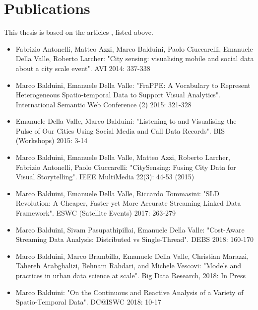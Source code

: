 \section{Publications}

This thesis is based on the articles \cite{DBLP:conf/avi/AntonelliABCVL14,DBLP:conf/semweb/BalduiniV15,DBLP:conf/bis/ValleB15,DBLP:conf/esws/BalduiniV017a,DBLP:journals/ieeemm/BalduiniVALAC15,DBLP:conf/debs/BalduiniPV18,BalduiniJBD2018,BalduiniISWC2018DC}, listed above.

\begin{itemize}
\item Fabrizio Antonelli, Matteo Azzi, Marco Balduini, Paolo Ciuccarelli, Emanuele Della Valle, Roberto Larcher:
"City sensing: visualising mobile and social data about a city scale event". AVI 2014: 337-338

\item Marco Balduini, Emanuele Della Valle:
"FraPPE: A Vocabulary to Represent Heterogeneous Spatio-temporal Data to Support Visual Analytics". International Semantic Web Conference (2) 2015: 321-328

\item 	Emanuele Della Valle, Marco Balduini:
"Listening to and Visualising the Pulse of Our Cities Using Social Media and Call Data Records". BIS (Workshops) 2015: 3-14

\item Marco Balduini, Emanuele Della Valle, Matteo Azzi, Roberto Larcher, Fabrizio Antonelli, Paolo Ciuccarelli:
"CitySensing: Fusing City Data for Visual Storytelling". IEEE MultiMedia 22(3): 44-53 (2015)

\item 	Marco Balduini, Emanuele Della Valle, Riccardo Tommasini:
"SLD Revolution: A Cheaper, Faster yet More Accurate Streaming Linked Data Framework". ESWC (Satellite Events) 2017: 263-279

\item Marco Balduini, Sivam Pasupathipillai, Emanuele Della Valle:
"Cost-Aware Streaming Data Analysis: Distributed vs Single-Thread". DEBS 2018: 160-170

\item Marco Balduini, Marco Brambilla, Emanuele Della Valle, Christian Marazzi, Tahereh Arabghalizi, Behnam Rahdari, and Michele Vescovi:
"Models and practices in urban data science at scale". Big Data Research, 2018: In Press

\item Marco Balduini:
"On the Continuous and Reactive Analysis of a Variety of Spatio-Temporal Data". DC@ISWC 2018: 10-17

\end{itemize}